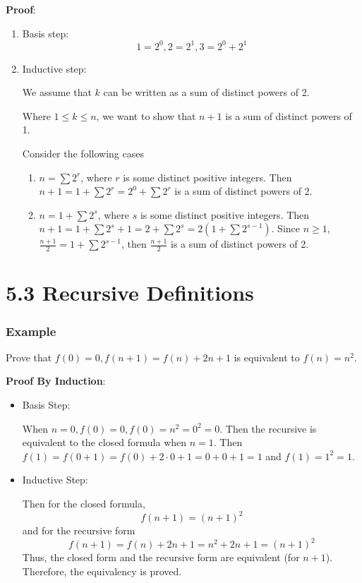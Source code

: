 \documentclass{article}
\begin{document}
\textbf{Proof}:
\begin{enumerate}
	\item Basis step:
	      \begin{equation*}
		      1 = 2^0, 2 = 2^1, 3 = 2^0 + 2^1
	      \end{equation*}
	\item Inductive step:

	      We assume that $ k $ can be written as a sum of distinct powers of 2.

	      Where $ 1 \leq k \leq n $, we want to show that $ n + 1 $ is a sum of distinct powers of 1.

	      Consider the following cases
	      \begin{enumerate}
		      \item $ n = \sum 2^r $, where $ r $ is some distinct positive integers. Then $ n + 1 = 1 + \sum 2^r = 2^0 + \sum 2^r $ is a sum of distinct powers of 2.

		      \item $ n = 1 + \sum 2^s $, where $ s $ is some distinct positive integers. Then $ n + 1 = 1 + \sum 2^s + 1 = 2 + \sum 2^s = 2 \left( 1 + \sum 2^{s - 1} \right) $. Since $ n \geq 1 $, $ \frac{ n + 1 }{ 2 } = 1 + \sum 2^{s - 1} $, then $ \frac{ n + 1 }{ 2 } $ is a sum of distinct powers of 2.
	      \end{enumerate}
\end{enumerate}

\section{5.3 Recursive Definitions}

\subsubsection{Example}

Prove that $ f(0) = 0, f(n + 1) = f(n) + 2n + 1 $ is equivalent to $ f(n) = n^2 $.

\textbf{Proof By Induction}:

\begin{itemize}
	\item Basis Step:

	      When $ n = 0, f(0) = 0, f(0) = n^2 = 0^2 = 0 $. Then the recursive is equivalent to the closed formula when $ n = 1 $. Then $ f(1) = f(0 + 1) = f(0) + 2 \cdot 0 + 1 = 0 + 0 + 1 = 1 $ and $ f(1) = 1^2 = 1 $.

	\item Inductive Step:

	      Then for the closed formula,
	      \begin{equation*}
		      f(n + 1) = (n + 1)^2
	      \end{equation*}
	      and for the recursive form
	      \begin{equation*}
		      f(n + 1) = f(n) + 2n + 1 = n^2 + 2n + 1 = (n + 1)^2
	      \end{equation*}
	      Thus, the closed form and the recursive form are equivalent (for $ n + 1$). Therefore, the equivalency is proved.
\end{itemize}
\end{document}
